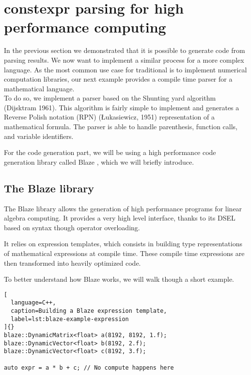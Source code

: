 \documentclass[../paper.tex]{subfiles}
\begin{document}
\section{constexpr parsing for high performance computing}
\label{lbl:math-parsing}

In the previous section we demonstrated that it is possible to generate code
from \constexpr parsing results. We now want to implement a similar process for
a more complex language. As the most common use case for traditional
\cpp \dsel is to implement numerical computation libraries, our next example
provides a compile time parser for a mathematical language.\\

To do so, we implement a \constexpr parser based on the Shunting
yard algorithm (Dijsktram 1961). This algorithm is fairly simple to implement
and generates a Reverse Polish notation (RPN) (Łukasiewicz, 1951) representation
of a mathematical formula. The parser is able to handle parenthesis,
function calls, and variable identifiers.

For the code generation part, we will be using a high performance
code generation library called Blaze \cite{blazelib}, which we will
briefly introduce.

\subsection{The Blaze library}

The Blaze library allows the generation of high performance programs for
linear algebra computing. It provides a very high level interface, thanks
to its DSEL based on \cpp syntax though operator overloading.

It relies on expression templates, which consists in building
type representations of mathematical expressions at compile time.
These compile time expressions are then transformed into heavily optimized code.

To better understand how Blaze works, we will walk though a short example.


\begin{lstlisting}[
  language=C++,
  caption=Building a Blaze expression template,
  label=lst:blaze-example-expression
]{}
blaze::DynamicMatrix<float> a(8192, 8192, 1.f);
blaze::DynamicVector<float> b(8192, 2.f);
blaze::DynamicVector<float> c(8192, 3.f);

auto expr = a * b + c; // No compute happens here
\end{lstlisting}
\end{document}
